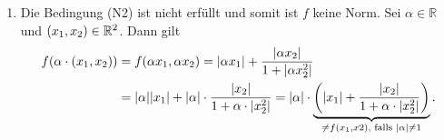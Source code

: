 \documentclass[german,12pt]{homework}
\newcommand{\RR}{\mathbb{R}}
\DeclarePairedDelimiter{\absolute}{\lvert}{\rvert}
\DeclarePairedDelimiter{\enbrace}{(}{)}
\begin{document}
\begin{enumerate}
\begin{enumerate}[label=(N\arabic*)]
        \end{enumerate}
        \item Die Bedingung (N2) ist nicht erfüllt und somit ist \(f\) keine
        Norm. Sei \(\alpha \in \RR\) und \(\enbrace*{x_1, x_2} \in \RR^2\).
        Dann gilt
        \begin{align*}
            f\enbrace*{\alpha \cdot \enbrace*{x_1, x_2}} &=
            f\enbrace*{\alpha{x_1}, \alpha{x_2}} = \absolute*{\alpha{x_1}} +
            \frac{\absolute*{\alpha{x_2}}}{1 + \absolute*{\alpha{x_2^2}}}\\
            &= \absolute*{\alpha}\absolute*{x_1} + \absolute*{\alpha} \cdot
            \frac{\absolute*{x_2}}{1 + \alpha \cdot \absolute*{x_2^2}} =
            \absolute*{\alpha} \cdot \underbrace{\enbrace*{\absolute*{x_1} +
            \frac{\absolute*{x_2}}{1 + \alpha \cdot \absolute*{x_2^2}}}}_{\ne
            f\enbrace*{x_1, x2}\text{, falls }\absolute*{\alpha} \ne 1}.
        \end{align*}
    \end{enumerate}
\end{document}
